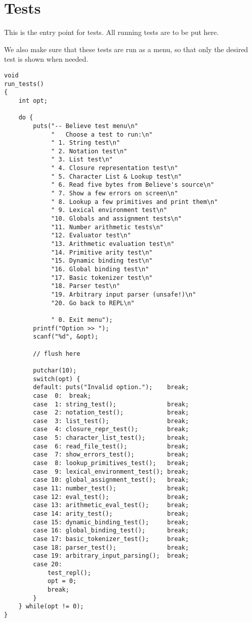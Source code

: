 \documentclass[openright,a4paper,twoside,12pt]{memoir}
\begin{document}
\section{Tests}
\label{sec:org183b9b9}

This is the entry point for tests. All running tests are to be put
here.

We also make sure that these tests are run as a menu, so that only the
desired test is shown when needed.

\begin{verbatim}
void
run_tests()
{
    int opt;

    do {
        puts("-- Believe test menu\n"
             "   Choose a test to run:\n"
             " 1. String test\n"
             " 2. Notation test\n"
             " 3. List test\n"
             " 4. Closure representation test\n"
             " 5. Character List & Lookup test\n"
             " 6. Read five bytes from Believe's source\n"
             " 7. Show a few errors on screen\n"
             " 8. Lookup a few primitives and print them\n"
             " 9. Lexical environment test\n"
             "10. Globals and assignment tests\n"
             "11. Number arithmetic tests\n"
             "12. Evaluator test\n"
             "13. Arithmetic evaluation test\n"
             "14. Primitive arity test\n"
             "15. Dynamic binding test\n"
             "16. Global binding test\n"
             "17. Basic tokenizer test\n"
             "18. Parser test\n"
             "19. Arbitrary input parser (unsafe!)\n"
             "20. Go back to REPL\n"
             
             " 0. Exit menu");
        printf("Option >> ");
        scanf("%d", &opt);

        // flush here

        putchar(10);
        switch(opt) {
        default: puts("Invalid option.");    break;
        case  0:  break;
        case  1: string_test();              break;
        case  2: notation_test();            break;
        case  3: list_test();                break;
        case  4: closure_repr_test();        break;
        case  5: character_list_test();      break;
        case  6: read_file_test();           break;
        case  7: show_errors_test();         break;
        case  8: lookup_primitives_test();   break;
        case  9: lexical_environment_test(); break;
        case 10: global_assignment_test();   break;
        case 11: number_test();              break;
        case 12: eval_test();                break;
        case 13: arithmetic_eval_test();     break;
        case 14: arity_test();               break;
        case 15: dynamic_binding_test();     break;
        case 16: global_binding_test();      break;
        case 17: basic_tokenizer_test();     break;
        case 18: parser_test();              break;
        case 19: arbitrary_input_parsing();  break;
        case 20:
            test_repl();
            opt = 0;
            break;
        }
    } while(opt != 0);
}
\end{verbatim}
\end{document}
